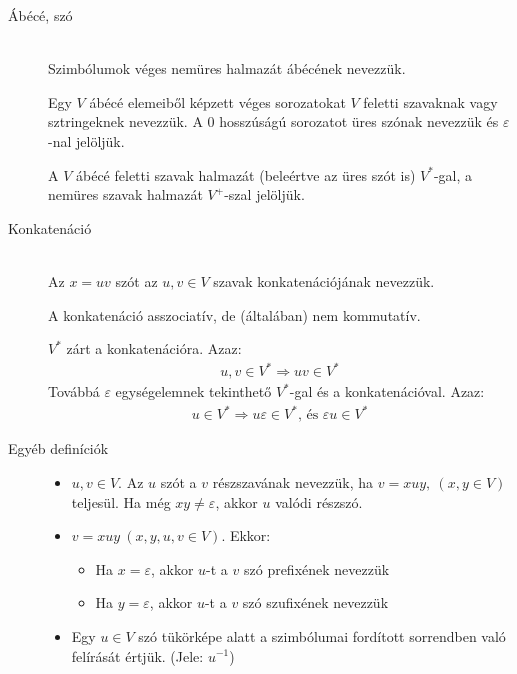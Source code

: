\documentclass[margin=0px]{article}
\begin{document}
			\begin{description}
				\item[Ábécé, szó] \hfill \\
					Szimbólumok véges nemüres halmazát ábécének nevezzük.
					
					Egy $V$ ábécé elemeiből képzett véges sorozatokat $V$ feletti szavaknak vagy sztringeknek nevezzük. A 0 hosszúságú sorozatot üres szónak nevezzük és
					$\varepsilon$-nal jelöljük.
					
					A $V$ ábécé feletti szavak halmazát (beleértve az üres szót is) $V^*$-gal, a nemüres szavak halmazát $V^+$-szal jelöljük.
					
				\item[Konkatenáció] \hfill \\
					Az $ x = uv$ szót az $u,v \in V$ szavak konkatenációjának nevezzük.
					
					A konkatenáció asszociatív, de (általában) nem kommutatív.
					
					$V^*$ zárt a konkatenációra. Azaz:
					\begin{align*}
						u,v \in V^* \Rightarrow uv \in V^*
					\end{align*}
					Továbbá $\varepsilon$ egységelemnek tekinthető $V^*$-gal és a konkatenációval. Azaz:
					\begin{align*}
					u \in V^* \Rightarrow u\varepsilon \in V^* \textrm{, és }\varepsilon u \in V^*
					\end{align*}
				\item[Egyéb definíciók] \hfill 
					\begin{itemize}
						\item $u,v \in V$. Az $u$ szót a $v$ részszavának nevezzük, ha $ v = xuy , \ (x,y \in V)$ teljesül. Ha még $xy\neq\varepsilon$, akkor $u$ valódi részszó.
						
						\item $ v  = xuy \ (x,y,u,v \in V)$. Ekkor:
						\begin{itemize}
							\item Ha $x=\varepsilon$, akkor $u$-t a $v$ szó prefixének nevezzük 
							\item Ha $y=\varepsilon$, akkor $u$-t a $v$ szó szufixének nevezzük 
						\end{itemize}
						
						\item Egy $u\in V$ szó tükörképe alatt a szimbólumai fordított sorrendben való felírását értjük. (Jele: $u^{-1}$)
					\end{itemize}
				\end{description}
\end{document}
